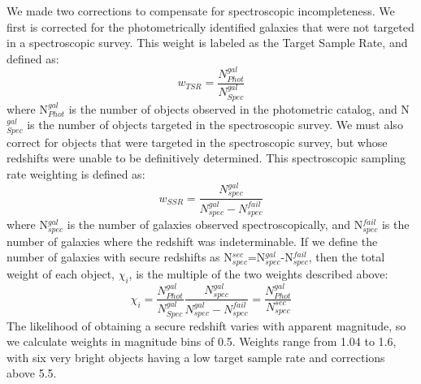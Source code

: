 \documentclass[manuscript]{aastex61}
\begin{document}
We made two corrections to compensate for spectroscopic incompleteness. We first is corrected for the photometrically identified galaxies that were not targeted in a spectroscopic survey. This weight is labeled as the Target Sample Rate, and defined as:
\begin{equation}
w_{TSR}=\frac{N^{gal}_{Phot}}{N^{gal}_{Spec}}
\label{eq:equation 12}
\end{equation}
where N$^{gal}_{Phot}$ is the number of objects observed in the photometric catalog, and N$^{gal}_{Spec}$ is the number of objects targeted in the spectroscopic survey. We must also correct for objects that were targeted in the spectroscopic survey, but whose redshifts were unable to be definitively determined. This spectroscopic sampling rate weighting is defined as:
\begin{equation}
w_{SSR}=\frac{N^{gal}_{spec}}{N^{gal}_{spec}-N^{fail}_{spec}}
\label{eq:equation 13}
\end{equation}
where N$^{gal}_{spec}$ is the number of galaxies observed spectroscopically, and N$^{fail}_{spec}$ is the number of galaxies where the redshift was indeterminable. If we define the number of galaxies with secure redshifts as N$^{sec}_{spec}$=N$^{gal}_{spec}$-N$^{fail}_{spec}$, then the total weight of each object, $\chi_{i}$, is the multiple of the two weights described above:
\begin{equation}
\chi_{i}=\frac{N^{gal}_{Phot}}{N^{gal}_{Spec}}\frac{N^{gal}_{spec}}{N^{gal}_{spec}-N^{fail}_{spec}}=\frac{N^{gal}_{Phot}}{N^{sec}_{spec}}
\label{eq:equation 14}
\end{equation}
The likelihood of obtaining a secure redshift varies with apparent magnitude, so we calculate weights in magnitude bins of 0.5. Weights range from 1.04 to 1.6, with six very bright objects having a low target sample rate and corrections above 5.5.
\end{document}
